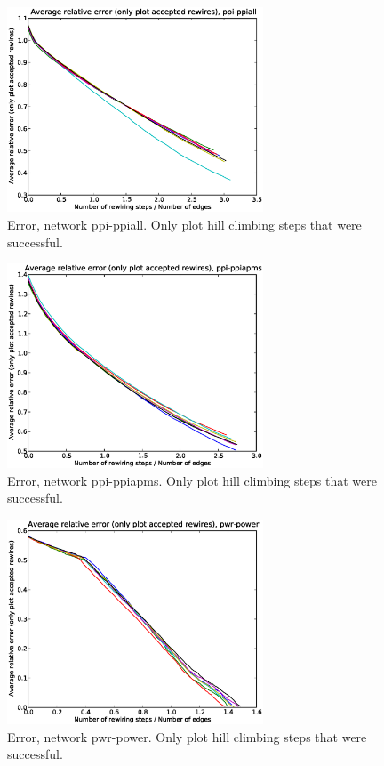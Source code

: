 \begin{figure}[p]
\centering
\includegraphics[width=3in]{Figures/acceptedOnly-ppi-ppiall.eps}
\caption{Error, network ppi-ppiall.  Only plot hill climbing steps that were successful.}
\label{fig:errors-ppi-ppiall}
\end{figure}

\begin{figure}[p]
\centering
\includegraphics[width=3in]{Figures/acceptedOnly-ppi-ppiapms.eps}
\caption{Error, network ppi-ppiapms.  Only plot hill climbing steps that were successful.}
\label{fig:errors-ppi-ppiapms}
\end{figure}

\begin{figure}[p]
\centering
\includegraphics[width=3in]{Figures/acceptedOnly-pwr-power.eps}
\caption{Error, network pwr-power.  Only plot hill climbing steps that were successful.}
\label{fig:errors-pwr-power}
\end{figure}

